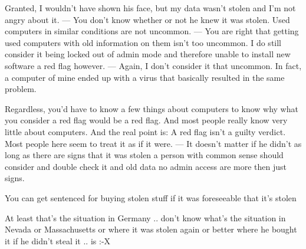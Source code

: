 \documentclass[11pt]{article}
\begin{document}
Granted, I wouldn't have shown his face, but my data wasn't stolen and I'm not angry about it.
---
You don't know whether or not he knew it was stolen. Used computers in similar conditions are not uncommon.
---
You are right that getting used computers with old information on them isn't too uncommon. I do still consider it being locked out of admin mode and therefore unable to install new software a red flag however.
---
Again, I don't consider it that uncommon. In fact, a computer of mine ended up with a virus that basically resulted in the same problem.

Regardless, you'd have to know a few things about computers to know why what you consider a red flag would be a red flag. And most people really know very little about computers. And the real point is: A red flag isn't a guilty verdict. Most people here seem to treat it as if it were.
---
It doesn't matter if he didn't as long as there are signs that it was stolen a person with common sense should consider and double check it﻿ and old data no admin access are more then just signs.

You can get sentenced for buying stolen stuff if it was foreseeable that it's stolen

At least that's the situation in Germany .. don't know what's the situation in Nevada or Massachusetts or where it was stolen again or better where he bought it if he didn't steal it .. is :-X
\end{document}
